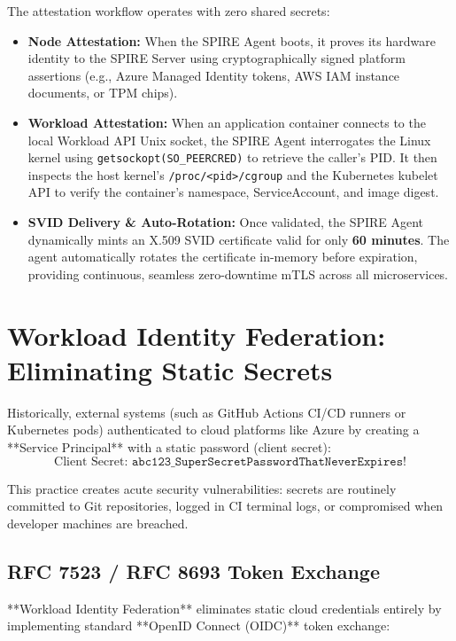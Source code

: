 The attestation workflow operates with zero shared secrets:
\begin{itemize}[leftmargin=12pt]
  \item \textbf{Node Attestation:} When the SPIRE Agent boots, it proves its hardware identity to the SPIRE Server using cryptographically signed platform assertions (e.g., Azure Managed Identity tokens, AWS IAM instance documents, or TPM chips).
  \item \textbf{Workload Attestation:} When an application container connects to the local Workload API Unix socket, the SPIRE Agent interrogates the Linux kernel using \texttt{getsockopt(SO\_PEERCRED)} to retrieve the caller's PID. It then inspects the host kernel's \texttt{/proc/<pid>/cgroup} and the Kubernetes kubelet API to verify the container's namespace, ServiceAccount, and image digest.
  \item \textbf{SVID Delivery \& Auto-Rotation:} Once validated, the SPIRE Agent dynamically mints an X.509 SVID certificate valid for only \textbf{60 minutes}. The agent automatically rotates the certificate in-memory before expiration, providing continuous, seamless zero-downtime mTLS across all microservices.
\end{itemize}

\section{Workload Identity Federation: Eliminating Static Secrets}

Historically, external systems (such as GitHub Actions CI/CD runners or Kubernetes pods) authenticated to cloud platforms like Azure by creating a **Service Principal** with a static password (client secret):
\begin{equation*}
\text{Client Secret: } \texttt{abc123\_SuperSecretPasswordThatNeverExpires!}
\end{equation*}

This practice creates acute security vulnerabilities: secrets are routinely committed to Git repositories, logged in CI terminal logs, or compromised when developer machines are breached.

\subsection{RFC 7523 / RFC 8693 Token Exchange}
**Workload Identity Federation** eliminates static cloud credentials entirely by implementing standard **OpenID Connect (OIDC)** token exchange:

